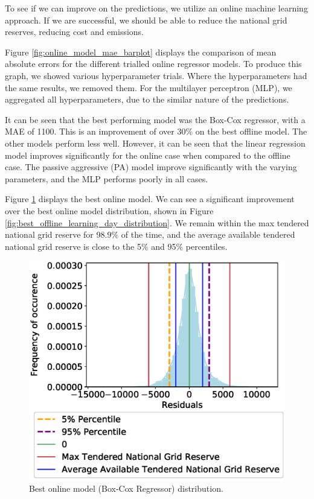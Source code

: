 \documentclass[final,3p,times,twocolumn,numbers]{elsarticle}
\begin{document}
To see if we can improve on the predictions, we utilize an online machine learning approach. If we are successful, we should be able to reduce the national grid reserves, reducing cost and emissions.


Figure \ref{fig:online_model_mae_barplot} displays the comparison of mean absolute errors for the different trialled online regressor models. To produce this graph, we showed various hyperparameter trials. Where the hyperparameters had the same results, we removed them. For the multilayer perceptron (MLP), we aggregated all hyperparameters, due to the similar nature of the predictions.

It can be seen that the best performing model was the Box-Cox regressor, with a MAE of 1100. This is an improvement of over 30\% on the best offline model. The other models perform less well. However, it can be seen that the linear regression model improves significantly for the online case when compared to the offline case. The passive aggressive (PA) model improve significantly with the varying parameters, and the MLP performs poorly in all cases.



Figure \ref{fig:best_online_learning_day_distribution} displays the best online model. We can see a significant improvement over the best online model distribution, shown in Figure \ref{fig:best_offline_learning_day_distribution}. We remain within the max tendered national grid reserve for 98.9\% of the time, and the average available tendered national grid reserve is close to the 5\% and 95\% percentiles.



\begin{figure}
\centering
\includegraphics[width=\columnwidth,natwidth=500,natheight=500]{figures/results/online_learning_dists-power-0.1.eps}
\caption{Best online model (Box-Cox Regressor) distribution.}
\label{fig:best_online_learning_day_distribution}
\end{figure}
\end{document}
